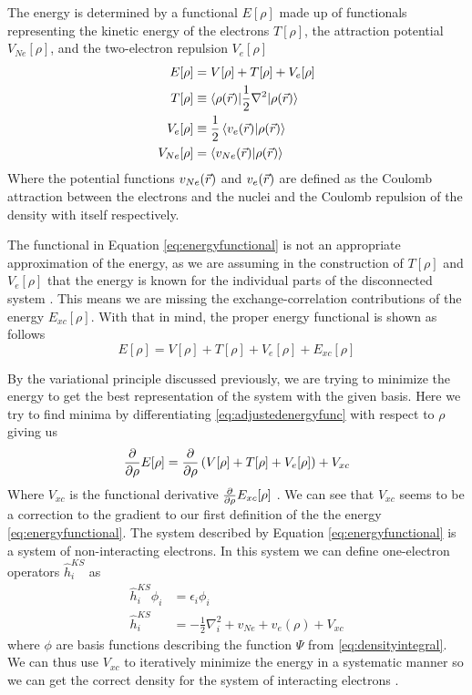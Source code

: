 \documentclass[../master_thesis.tex]{subfiles}
\begin{document}
The energy is determined by a functional $E[\rho]$ made up of functionals representing
the kinetic energy of the electrons $T[\rho]$, the attraction potential $V_{Ne}[\rho]$,
and the two-electron repulsion $V_{e}[\rho]$ \cite{Sorland, PhysRev.136.B864}
\begin{align}
  \label{eq:energyfunctional}
  E[\rho] &= V[\rho] + T[\rho] + V_{e}[\rho]\\
  T[\rho] &\equiv\braket{\rho(\vec{r})| \frac{1}{2}\nabla^2| \rho(\vec{r})} \\
  V_{e}[\rho] &\equiv \frac{1}{2}\braket{v_{e}(\vec{r})| \rho(\vec{r})}\\
  V_{Ne}[\rho] &= \braket{v_{Ne}(\vec{r})|\rho(\vec{r})}
\end{align}
Where the potential functions $v_{Ne}(\vec{r})$  and $v_{e}(\vec{r})$ are defined as the Coulomb
attraction between the electrons and the nuclei and the Coulomb repulsion of the
density with itself \cite{Sorland} respectively.

The functional in Equation \ref{eq:energyfunctional} is not an appropriate approximation
of the energy, as we are assuming in the construction of $T[\rho]$ and $V_{e}[\rho]$
that the energy is known for the individual parts of the disconnected system \cite{Sorland}.
This means we are missing the exchange-correlation contributions of the energy $E_{xc}[\rho]$.
With that in mind, the proper energy functional is shown as follows
\begin{equation}\label{eq:adjustedenergyfunc}
  E[\rho] = V[\rho] + T[\rho] + V_{e}[\rho] + E_{xc}[\rho]
\end{equation}

By the variational principle discussed previously, we are trying to minimize the energy
to get the best representation of the system with the given basis. Here we try to
find minima by differentiating \ref{eq:adjustedenergyfunc} with respect to $\rho$ giving us
\begin{align}\label{eq:energyderiv}
   \frac{\partial}{\partial \rho}E[\rho] = \frac{\partial}{\partial \rho}\left( V[\rho] + T[\rho] + V_{e}[\rho]\right) + V_{xc}
\end{align}
Where $V_{xc}$ is the functional derivative $\frac{\partial}{\partial \rho}E_{xc}[\rho]$ \cite{Cramer:2004}.
We can see that $V_{xc}$ seems to be a correction to the gradient to our first definition
of the the energy \ref{eq:energyfunctional}. The system described by Equation
\ref{eq:energyfunctional} is a system of non-interacting electrons. In this
system we can define one-electron operators $\hat{h}_i^{KS}$ as
\begin{align}
  \hat{h}_i^{KS} \phi_i &= \epsilon_i \phi_i \\
  \hat{h}_i^{KS} &= - \frac{1}{2}\nabla^2_i + v_{Ne} + v_e(\rho) + V_{xc}
\end{align}
where $\phi$ are basis functions describing the function $\Psi$ from \ref{eq:densityintegral}.
We can thus use $V_{xc}$ to iteratively minimize the energy in a systematic manner so we can
get the correct density for the system of interacting electrons \cite{Cramer:2004}.
\end{document}
